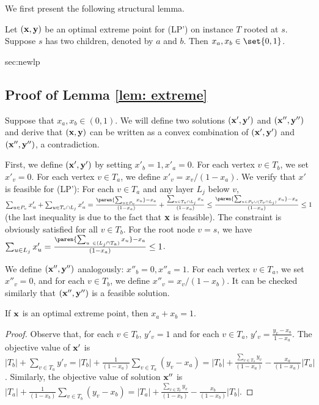 We first present the following structural lemma. 
\begin{lemma}
\label{lem: extreme}  
Let $({\bf x},{\bf y})$ be an optimal extreme point for (LP') on instance $T$ rooted at $s$. Suppose $s$ has two children, denoted by $a$ and $b$.  
Then $x_a, x_b \in \set{0,1}$.  
\end{lemma}  

\begin{appendixproof}{sec:newlp}{\subsection{Proof of Lemma \ref{lem: extreme}}}
Suppose that $x_a, x_b \in (0,1)$. 
We will define two solutions $({\bf x'},{\bf y'})$ and $({\bf x''}, {\bf y''})$ and derive that $({\bf x},{\bf y})$ can be written as a convex combination of $({\bf x'},{\bf y'})$ and $({\bf x''}, {\bf y''})$, a contradiction.

First, we define $({\bf x}',{\bf y}')$ by setting $x'_b = 1, x'_a=0$. For each vertex $v \in T_b$, we set $x'_v = 0$. For each vertex $v \in T_a$, we define $x'_v = x_v/(1-x_a)$.
We verify that $x'$ is feasible for (LP'): For each $v \in T_a$ and any layer $L_j$ below $v$, $\sum_{u \in P_v} x'_u + \sum_{u \in T_v \cap L_j} x'_u = \frac{\paren{\sum_{u \in P_v} x_u} - x_a}{(1-x_a)} + \frac{\sum_{u \in T_v \cap L_j} x_u}{(1-x_a)} \leq \frac{\paren{\sum_{u \in P_v \cup (T_v \cap L_j)} x_u} -x_a}{(1-x_a)} \leq 1$ (the last inequality is due to the fact that ${\bf x}$ is feasible).
The constraint is obviously satisfied for all $v \in T_b$.  
For the root node $v =s$, we have $\sum_{u \in L_j} x'_u = \frac{\paren{\sum_{u\ \in (L_j \cap T_a)} x_u} - x_a}{(1-x_a)} \leq 1$.  

We define $({\bf x}'',{\bf y}'')$ analogously: $x''_b =0, x''_a =1$. For each vertex $v \in T_a$, we set $x''_v = 0$, and for each $v \in T_b$, we define $x''_v = x_v/ (1-x_b)$. 
It can be checked similarly that $({\bf x}'',{\bf y}'')$ is a feasible solution.  

\begin{claim} 
If ${\bf x}$ is an optimal extreme point, then $x_a + x_b =1$. 
\label{claim:extremepoint}
\end{claim} 

\begin{proof}Observe that, for each $v \in T_b$, $y'_v = 1$ and for each $v \in T_a$, $y'_v = \frac{y_v  - x_a}{1-x_a}$.  
The objective value of ${\bf x'}$ is $|T_b| + \sum_{v \in T_a} y'_v = |T_b| + \frac{1}{(1-x_a)} \sum_{v \in T_a} (y_v - x_a) = |T_b| + \frac{\sum_{v \in T_a} y_v}{(1-x_a)} - \frac{x_a}{(1-x_a)} |T_a|$.
Similarly, the objective value of solution ${\bf x''}$ is $|T_a| + \frac{1}{(1-x_b)} \sum_{v \in T_b} (y_v - x_b) = |T_a| + \frac{\sum_{v \in T_b} y_v}{(1-x_b)} - \frac{x_b}{(1-x_b)} |T_b|$.
 

\end{proof}
\end{appendixproof}

